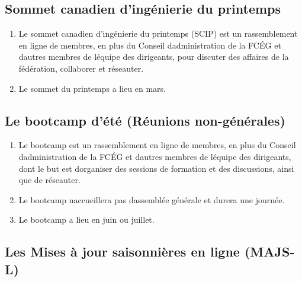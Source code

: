 \subsection{Sommet canadien d'ingénierie du printemps}
\label{sommet-canadien-d-ingenierie-du-printemps}

\begin{enumerate}
 \item
  Le sommet canadien d'ingénierie du printemps (SCIP) est un rassemblement en ligne de membres, en plus du Conseil d\textquotesingle administration de la FCÉG et d\textquotesingle autres membres de l\textquotesingle équipe des dirigeants, pour discuter des affaires de la fédération, collaborer et réseauter.
 \item
  Le sommet du printemps a lieu en mars.
\end{enumerate}

\subsection{Le bootcamp d'été (Réunions non-générales)}
\label{le-bootcamp-d-ete-reunions-non-generales}

\begin{enumerate}
 \item
  Le bootcamp est un rassemblement en ligne de membres, en plus du Conseil d\textquotesingle administration de la FCÉG et d\textquotesingle autres membres de l\textquotesingle équipe des dirigeants, dont le but est d\textquotesingle organiser des sessions de formation et des discussions, ainsi que de réseauter.
 \item
  Le bootcamp n\textquotesingle accueillera pas d\textquotesingle assemblée générale et durera une journée.
 \item
  Le bootcamp a lieu en juin ou juillet.
\end{enumerate}

\subsection{Les Mises à jour saisonnières en ligne (MAJS-L)}
\label{les-mises-a-jour-saisonnieres-en-ligne-majs-l}

